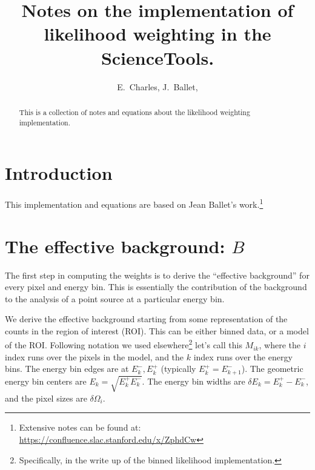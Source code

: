 \documentclass[preprint]{aastex}
\begin{document}
%
\title{Notes on the implementation of likelihood weighting in the ScienceTools.}  

\author{ 
E.~Charles, 
J.~Ballet, 
}


\begin{abstract}
  This is a collection of notes and equations about the likelihood weighting implementation.
\end{abstract}

\maketitle

\section{Introduction}

This implementation and equations are based on Jean Ballet's work.\footnote{Extensive notes can be found at: \url{https://confluence.slac.stanford.edu/x/ZphdCw}}


\section{The effective background: \texorpdfstring{$B$}{B}}

The first step in computing the weights is to derive the ``effective
background'' for every pixel and energy bin.  This is essentially the
contribution of the background to the analysis of a point source at a
particular energy bin.

We derive the effective background starting from some representation
of the counts in the region of interest (ROI).  This can be either
binned data, or a model of the ROI.  Following notation we used
elsewhere\footnote{Specifically, in the write up of the binned
  likelihood implementation.} let's call this $M_{ik}$, where the $i$
index runs over the pixels in the model, and the $k$ index runs over
the energy bins.  The energy bin edges are at $E_k^-, E_k^+$
(typically $E_k^+ = E_{k+1}^-$).  The geometric energy bin centers are
$E_k = \sqrt{E_k^+ E_k^-}$.  The energy bin widths are $\delta E_k = E_k^+
- E_k^-$, and the pixel sizes are $\delta \Omega_i$.
\end{document}
